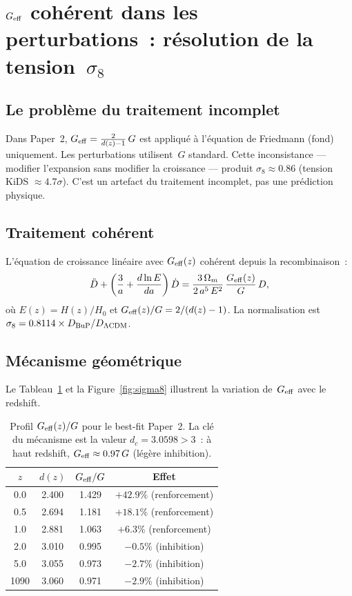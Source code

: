 \documentclass[a4paper,11pt]{article}
\newcommand{\DC}{d_c}
\newcommand{\Geff}{G_{\rm eff}}
\newcommand{\sig}{\sigma_8}
\newcommand{\LCDM}{\Lambda\mathrm{CDM}}
\begin{document}
\section{$G_{\rm eff}$ cohérent dans les perturbations~:
  résolution de la tension~$\sigma_8$}
\label{sec:sigma8}

\subsection{Le problème du traitement incomplet}

Dans Paper~2, $\Geff=\frac{2}{d(z)-1}\,G$ est appliqué à
l'équation de Friedmann (fond) uniquement. Les perturbations
utilisent~$G$ standard. Cette inconsistance --- modifier
l'expansion sans modifier la croissance --- produit $\sig\approx 0.86$
(tension KiDS $\approx 4.7\sigma$). C'est un artefact du traitement
incomplet, pas une prédiction physique.

\subsection{Traitement cohérent}

L'équation de croissance linéaire avec $\Geff(z)$ cohérent depuis
la recombinaison~:
\begin{equation}
  \ddot{D} + \left(\frac{3}{a} + \frac{d\ln E}{da}\right)\dot{D}
  = \frac{3\,\Omega_m}{2\,a^5\,E^2}\,\frac{\Geff(z)}{G}\,D,
  \label{eq:growth}
\end{equation}
où $E(z)=H(z)/H_0$ et $\Geff(z)/G=2/(d(z)-1)$. La normalisation
est $\sig=0.8114\times D_{\rm BuP}/D_{\LCDM}$.

\subsection{Mécanisme géométrique}

Le Tableau~\ref{tab:geff} et la Figure~\ref{fig:sigma8} illustrent
la variation de~$\Geff$ avec le redshift.

\begin{table}[htbp]
\centering
\caption{Profil $\Geff(z)/G$ pour le best-fit Paper~2.
La clé du mécanisme est la valeur $\DC=3.0598>3$~: à haut
redshift, $\Geff\approx 0.97\,G$ (légère inhibition).}
\label{tab:geff}
\smallskip
\begin{tabular}{cccc}
\toprule
$z$ & $d(z)$ & $\Geff/G$ & Effet \\
\midrule
0.0   & 2.400 & 1.429 & $+42.9\%$ (renforcement) \\
0.5   & 2.694 & 1.181 & $+18.1\%$ (renforcement) \\
1.0   & 2.881 & 1.063 & $+6.3\%$  (renforcement) \\
2.0   & 3.010 & 0.995 & $-0.5\%$  (inhibition) \\
5.0   & 3.055 & 0.973 & $-2.7\%$  (inhibition) \\
1090  & 3.060 & 0.971 & $-2.9\%$  (inhibition) \\
\bottomrule
\end{tabular}
\end{table}
\end{document}
